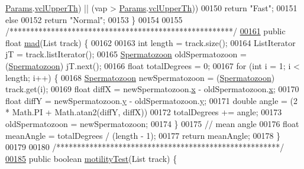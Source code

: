 \begin{DoxyCode}
      \hyperlink{classdata_1_1_params}{Params}.\hyperlink{classdata_1_1_params_ae0c29f446e3d569d730c8251a31e7ac2}{vclUpperTh}) || (vap > \hyperlink{classdata_1_1_params}{Params}.\hyperlink{classdata_1_1_params_ae0c29f446e3d569d730c8251a31e7ac2}{vclUpperTh}))
00150       \textcolor{keywordflow}{return} \textcolor{stringliteral}{"Fast"};
00151     \textcolor{keywordflow}{else}
00152       \textcolor{keywordflow}{return} \textcolor{stringliteral}{"Normal"};
00153   \}
00154 
00155   \textcolor{comment}{/******************************************************/}
\hypertarget{_kinematics_8java_source_l00161}{}\hyperlink{classfunctions_1_1_kinematics_a2b60196aad8d0eecb1c3048e0163ebc3}{00161}   \textcolor{keyword}{public} \textcolor{keywordtype}{float} \hyperlink{classfunctions_1_1_kinematics_a2b60196aad8d0eecb1c3048e0163ebc3}{mad}(List track) \{
00162 
00163     \textcolor{keywordtype}{int} length = track.size();
00164     ListIterator jT = track.listIterator();
00165     \hyperlink{classdata_1_1_spermatozoon}{Spermatozoon} oldSpermatozoon = (\hyperlink{classdata_1_1_spermatozoon}{Spermatozoon}) jT.next();
00166     \textcolor{keywordtype}{float} totalDegrees = 0;
00167     \textcolor{keywordflow}{for} (\textcolor{keywordtype}{int} i = 1; i < length; i++) \{
00168       \hyperlink{classdata_1_1_spermatozoon}{Spermatozoon} newSpermatozoon = (\hyperlink{classdata_1_1_spermatozoon}{Spermatozoon}) track.get(i);
00169       \textcolor{keywordtype}{float} diffX = newSpermatozoon.\hyperlink{classdata_1_1_spermatozoon_ad0da36b2558901e21e7a30f6c227a45e}{x} - oldSpermatozoon.\hyperlink{classdata_1_1_spermatozoon_ad0da36b2558901e21e7a30f6c227a45e}{x};
00170       \textcolor{keywordtype}{float} diffY = newSpermatozoon.\hyperlink{classdata_1_1_spermatozoon_aa4f0d3eebc3c443f9be81bf48561a217}{y} - oldSpermatozoon.\hyperlink{classdata_1_1_spermatozoon_aa4f0d3eebc3c443f9be81bf48561a217}{y};
00171       \textcolor{keywordtype}{double} angle = (2 * Math.PI + Math.atan2(diffY, diffX)) %
00172       totalDegrees += angle;
00173       oldSpermatozoon = newSpermatozoon;
00174     \}
00175     \textcolor{comment}{// mean angle}
00176     \textcolor{keywordtype}{float} meanAngle = totalDegrees / (length - 1);
00177     \textcolor{keywordflow}{return} meanAngle;
00178   \}
00179 
00180   \textcolor{comment}{/******************************************************/}
\hypertarget{_kinematics_8java_source_l00185}{}\hyperlink{classfunctions_1_1_kinematics_a5dbef047c19d4c554b08ba879eb7443f}{00185}   \textcolor{keyword}{public} \textcolor{keywordtype}{boolean} \hyperlink{classfunctions_1_1_kinematics_a5dbef047c19d4c554b08ba879eb7443f}{motilityTest}(List track) \{

\end{DoxyCode}
